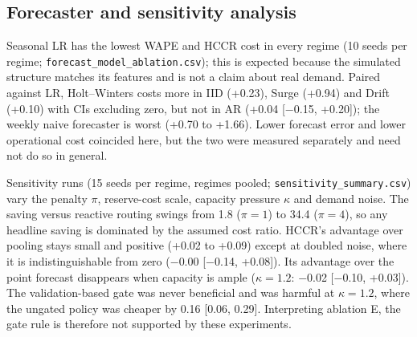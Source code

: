 \documentclass[conference]{IEEEtran}
\begin{document}
\subsection{Forecaster and sensitivity analysis}
Seasonal LR has the lowest WAPE and HCCR cost in every regime (10 seeds per regime; \texttt{forecast\_model\_ablation.csv}); this is expected because the simulated structure matches its features and is not a claim about real demand. Paired against LR, Holt--Winters costs more in IID (+0.23), Surge (+0.94) and Drift (+0.10) with CIs excluding zero, but not in AR (+0.04 [$-$0.15, +0.20]); the weekly naive forecaster is worst (+0.70 to +1.66). Lower forecast error and lower operational cost coincided here, but the two were measured separately and need not do so in general.

Sensitivity runs (15 seeds per regime, regimes pooled; \texttt{sensitivity\_summary.csv}) vary the penalty $\pi$, reserve-cost scale, capacity pressure $\kappa$ and demand noise. The saving versus reactive routing swings from 1.8 ($\pi{=}1$) to 34.4 ($\pi{=}4$), so any headline saving is dominated by the assumed cost ratio. HCCR's advantage over pooling stays small and positive (+0.02 to +0.09) except at doubled noise, where it is indistinguishable from zero ($-$0.00 [$-$0.14, +0.08]). Its advantage over the point forecast disappears when capacity is ample ($\kappa{=}1.2$: $-$0.02 [$-$0.10, +0.03]). The validation-based gate was never beneficial and was harmful at $\kappa{=}1.2$, where the ungated policy was cheaper by 0.16 [0.06, 0.29]. Interpreting ablation E, the gate rule is therefore not supported by these experiments.
\end{document}

